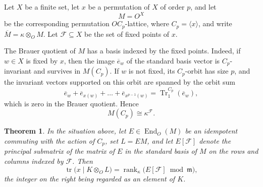 \documentclass[11pt]{article}
\theoremstyle{plain}
\newtheorem{theorem}{Theorem}[section]
\theoremstyle{remark}
\newcommand{\tr}{\operatorname{tr}}
\newcommand{\rank}{\operatorname{rank}}
\newcommand{\Tr}{\operatorname{Tr}}
\begin{document}
Let $X$ be a finite set, let $x$ be a permutation of $X$ of order $p$, and let
\[
 M=O^X
\]
be the corresponding permutation $OC_p$-lattice, where $C_p=\langle x\rangle$, and write $\overline M=\kappa\otimes_OM$.
Let $\mathcal F\subseteq X$ be the set of fixed points of $x$.

The Brauer quotient of $M$ has a basis indexed by the fixed points.
Indeed, if $w\in X$ is fixed by $x$,
then the image $\overline e_w$ of the standard basis vector is $C_p$-invariant and survives in $M(C_p)$.
If $w$ is not fixed, its $C_p$-orbit has size $p$, and the invariant vectors supported on this orbit are spanned by the orbit sum
\[
 \overline e_w+\overline e_{x(w)}+\dots+\overline e_{x^{p-1}(w)}=\Tr_1^{C_p}(\overline e_w),
\]
which is zero in the Brauer quotient.  Hence
\begin{equation}\label{eq:MC-basis}
 M(C_p)\cong \kappa^{\mathcal F}.
\end{equation}

\begin{theorem}\label{thm:local}
In the situation above, let $E\in\operatorname{End}_O(M)$ be an idempotent commuting with the action of $C_p$,
set $L=EM$,
and let $E[\mathcal F]$ denote the principal submatrix of the matrix of $E$ in the standard basis of $M$ on the rows and columns indexed by $\mathcal F$.
Then
\[
 \tr\bigl(x\mid K\otimes_O L\bigr)=\rank_{\kappa}\bigl(E[\mathcal F]\bmod \mathfrak m\bigr),
\]
the integer on the right being regarded as an element of $K$.
\end{theorem}
\end{document}
